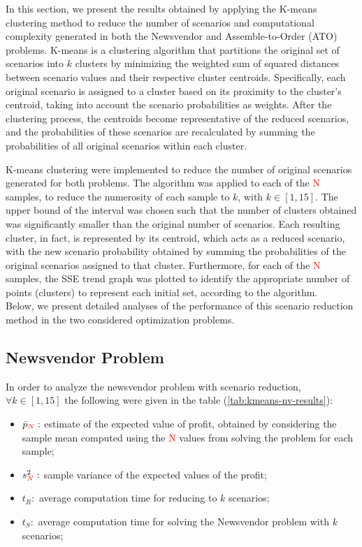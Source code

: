 \documentclass[a4paper,12pt]{article}
\begin{document}
	In this section, we present the results obtained by applying the K-means clustering method to reduce the number of scenarios and computational complexity generated in both the Newsvendor and Assemble-to-Order (ATO) problems. K-means is a clustering algorithm that partitions the original set of scenarios into \(k\) clusters by minimizing the weighted sum of squared distances between scenario values and their respective cluster centroids. Specifically, each original scenario is assigned to a cluster based on its proximity to the cluster's centroid, taking into account the scenario probabilities as weights. 
	After the clustering process, the centroids become representative of the reduced scenarios, and the probabilities of these scenarios are recalculated by summing the probabilities of all original scenarios within each cluster.
	
	\noindent K-means clustering were implemented to reduce the number of original scenarios generated for both problems. The algorithm was applied to each of the \textcolor{red}{N} samples, to reduce the numerosity of each sample to $k$, with $k \in [1,15]$. The upper bound of the interval was chosen such that the number of clusters obtained was significantly smaller than the original number of scenarios. Each resulting cluster, in fact, is represented by its centroid, which acts as a reduced scenario, with the new scenario probability obtained by summing the probabilities of the original scenarios assigned to that cluster. Furthermore, for each of the \textcolor{red}{N} samples, the SSE trend graph was plotted to identify the appropriate number of points (clusters) to represent each initial set, according to the algorithm.\\
	
	\noindent Below, we present detailed analyses of the performance of this scenario reduction method in the two considered optimization problems.
	
	\subsection{Newsvendor Problem}
	
In order to analyze the newsvendor problem with scenario reduction, $\forall k \in [1,15]$ the following were given in the table (\ref{tab:kmeans-nv-results}):
\begin{itemize}
	\item $\bar{p}_{\textcolor{red}{N}}:$ estimate of the expected value of profit, obtained by considering the sample mean computed using the \textcolor{red}{N} values from solving the problem for each sample; 
	\item $s^{2}_{\textcolor{red}{N}}:$ sample variance of the expected values of the profit;
	\item $t_{R}:$ average computation time for reducing to $k$ scenarios;
	\item $t_{S}:$ average computation time for solving the Newsvendor problem with $k$ scenarios;
\end{itemize}~
	
\end{document}
